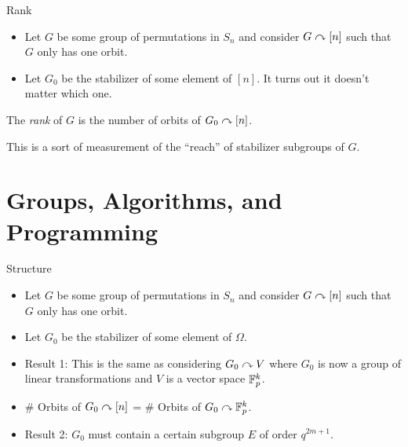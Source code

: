 \documentclass[aspectratio=169]{beamer}
\begin{document}
\begin{frame}{Rank}
    \begin{itemize}
        \item Let $G$ be some group of permutations in $S_n$ and consider $G \curvearrowright [n]$ such that $G$ only has one orbit.
        \item Let $G_0$ be the stabilizer of some element of $[n]$. 
        It turns out it doesn't matter which one.
    \end{itemize} \pause

    \begin{defn}
        The \emph{rank} of $G$ is the number of orbits of $G_0 \curvearrowright [n]$.
    \end{defn}

    This is a sort of measurement of the ``reach'' of stabilizer subgroups of $G$.
\end{frame}

\section{Groups, Algorithms, and Programming}
\frame{\sectionpage}

\begin{frame}{Structure}
    \begin{itemize}
        \item Let $G$ be some group of permutations in $S_n$ and consider $G \curvearrowright [n]$ such that $G$ only has one orbit.
        \item Let $G_0$ be the stabilizer of some element of $\Omega$.  \pause
        \item \textcolor{sigma@mainblue}{Result 1:} This is the same as considering $G_0 \curvearrowright V$ where $G_0$ is now a group of linear transformations and $V$ is a vector space $\mathbb{F}_p^k$. 
        \item \# Orbits of $G_0 \curvearrowright [n]$ = \# Orbits of $G_0 \curvearrowright \mathbb{F}_p^k$. \pause 
        \item \textcolor{sigma@mainblue}{Result 2:} $G_0$ must contain a certain subgroup $E$ of order $q^{2m + 1}$.
    \end{itemize}
\end{frame}
\end{document}
